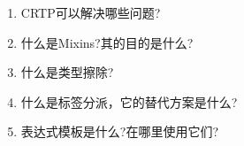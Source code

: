 \begin{enumerate}
\item
CRTP可以解决哪些问题?

\item
什么是Mixins?其的目的是什么?

\item
什么是类型擦除?

\item
什么是标签分派，它的替代方案是什么?

\item
表达式模板是什么?在哪里使用它们?
\end{enumerate}